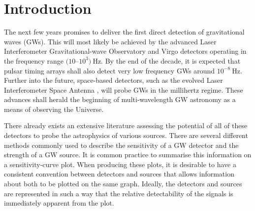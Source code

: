 \section{Introduction}


The next few years promises to deliver the first direct detection of gravitational waves (GWs). This will most likely be achieved by the advanced Laser Interferometer Gravitational-wave Observatory \citep[LIGO;][]{2010CQGra..27h4006H} and Virgo \citep{Accadia2011} detectors operating in the frequency range $(10$--$10^{3})~\mathrm{Hz}$. By the end of the decade, it is expected that pulsar timing arrays \citep[PTAs;][]{1990ApJ361300F} shall also detect very low frequency GWs around $10^{-8}~\mathrm{Hz}$. Further into the future, space-based detectors, such as the evolved Laser Interferometer Space Antenna \citep[eLISA;][]{2012CQGra..29l4016A}, will probe GWs in the millihertz regime. These advances shall herald the beginning of multi-wavelength GW astronomy as a means of observing the Universe.

There already exists an extensive literature assessing the potential of all of these detectors to probe the astrophysics of various sources. There are several different methods commonly used to describe the sensitivity of a GW detector and the strength of a GW source. It is common practice to summarise this information on a sensitivity-curve plot. When producing these plots, it is desirable to have a consistent convention between detectors and sources that allows information about both to be plotted on the same graph. Ideally, the detectors and sources are represented in such a way that the relative detectability of the signals is immediately apparent from the plot.

